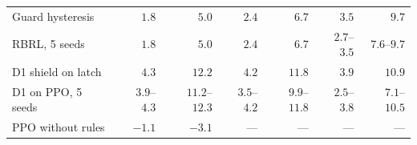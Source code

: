 \documentclass[11pt]{article}
\begin{document}
\begin{table}[!ht]
\begin{tabular*}{\textwidth}{@{\extracolsep{\fill}}lrrrrrr@{}}
Guard hysteresis & $1.8$ & $5.0$ & $2.4$ & $6.7$ & $3.5$ & $9.7$ \\
RBRL, 5 seeds & $1.8$ & $5.0$ & $2.4$ & $6.7$ & $2.7$--$3.5$ & $7.6$--$9.7$ \\
D1 shield on latch & $4.3$ & $12.2$ & $4.2$ & $11.8$ & $3.9$ & $10.9$ \\
D1 on PPO, 5 seeds & $3.9$--$4.3$ & $11.2$--$12.3$ & $3.5$--$4.2$ & $9.9$--$11.8$ & $2.5$--$3.8$ & $7.1$--$10.5$ \\
PPO without rules & $-1.1$ & $-3.1$ & --- & --- & --- & --- \\
\bottomrule
\end{tabular*}
\end{table}
\end{document}
